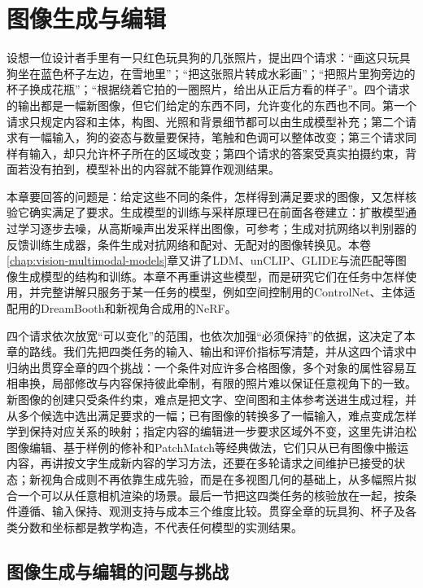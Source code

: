 \chapter{图像生成与编辑}
\label{chap:vision-image-generation}

设想一位设计者手里有一只红色玩具狗的几张照片，提出四个请求：“画这只玩具狗坐在蓝色杯子左边，在雪地里”；“把这张照片转成水彩画”；“把照片里狗旁边的杯子换成花瓶”；“根据绕着它拍的一圈照片，给出从正后方看的样子”。四个请求的输出都是一幅新图像，但它们给定的东西不同，允许变化的东西也不同。第一个请求只规定内容和主体，构图、光照和背景细节都可以由生成模型补充；第二个请求有一幅输入，狗的姿态与数量要保持，笔触和色调可以整体改变；第三个请求同样有输入，却只允许杯子所在的区域改变；第四个请求的答案受真实拍摄约束，背面若没有拍到，模型补出的内容就不能算作观测结果。

本章要回答的问题是：给定这些不同的条件，怎样得到满足要求的图像，又怎样核验它确实满足了要求。生成模型的训练与采样原理已在前面各卷建立：扩散模型通过学习逐步去噪，从高斯噪声出发采样出图像，可参考；生成对抗网络以判别器的反馈训练生成器，条件生成对抗网络和配对、无配对的图像转换见。本卷\ref{chap:vision-multimodal-models}章又讲了LDM、unCLIP、GLIDE与流匹配等图像生成模型的结构和训练。本章不再重讲这些模型，而是研究它们在任务中怎样使用，并完整讲解只服务于某一任务的模型，例如空间控制用的ControlNet、主体适配用的DreamBooth和新视角合成用的NeRF。

四个请求依次放宽“可以变化”的范围，也依次加强“必须保持”的依据，这决定了本章的路线。我们先把四类任务的输入、输出和评价指标写清楚，并从这四个请求中归纳出贯穿全章的四个挑战：一个条件对应许多合格图像，多个对象的属性容易互相串换，局部修改与内容保持彼此牵制，有限的照片难以保证任意视角下的一致。新图像的创建只受条件约束，难点是把文字、空间图和主体参考送进生成过程，并从多个候选中选出满足要求的一幅；已有图像的转换多了一幅输入，难点变成怎样学到保持对应关系的映射；指定内容的编辑进一步要求区域外不变，这里先讲泊松图像编辑、基于样例的修补和PatchMatch等经典做法，它们只从已有图像中搬运内容，再讲按文字生成新内容的学习方法，还要在多轮请求之间维护已接受的状态；新视角合成则不再依靠生成先验，而是在多视图几何的基础上，从多幅照片拟合一个可以从任意相机渲染的场景。最后一节把这四类任务的核验放在一起，按条件遵循、输入保持、观测支持与成本三个维度比较。贯穿全章的玩具狗、杯子及各类分数和坐标都是教学构造，不代表任何模型的实测结果。

\section{图像生成与编辑的问题与挑战}
\label{sec:vision-generation-challenges}


